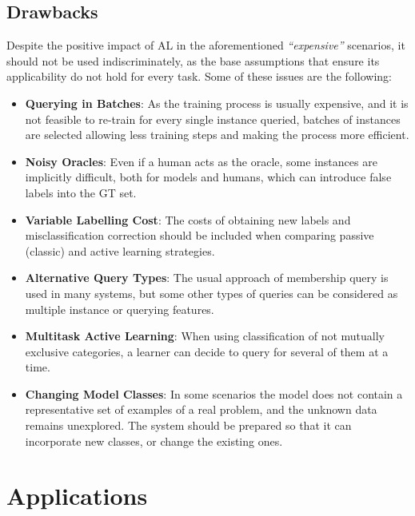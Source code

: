 \documentclass{scrartcl}
\begin{document}
  \subsection{Drawbacks} \label{subsec:drawbacks}
    Despite the positive impact of AL in the aforementioned \emph{``expensive''} scenarios, it should not be used indiscriminately, as the base assumptions that ensure its applicability do not hold for every task. Some of these issues are the following:
    \begin{itemize}
      \item \textbf{Querying in Batches}: As the training process is usually expensive, and it is not feasible to re-train for every single instance queried, batches of instances are selected allowing less training steps and making the process more efficient.
      \item \textbf{Noisy Oracles}: Even if a human acts as the oracle, some instances are implicitly difficult, both for models and humans, which can introduce false labels into the GT set.
      \item \textbf{Variable Labelling Cost}: The costs of obtaining new labels and misclassification correction should be included when comparing passive (classic) and active learning strategies.
      \item \textbf{Alternative Query Types}: The usual approach of membership query is used in many systems, but some other types of queries can be considered as multiple instance or querying features.
      \item \textbf{Multitask Active Learning}:  When using classification of not mutually exclusive categories, a learner can decide to query for several of them at a time.
      \item \textbf{Changing Model Classes}: In some scenarios the model does not contain a representative set of examples of a real problem, and the unknown data remains unexplored. The system should be prepared so that it can incorporate new classes, or change the existing ones.
    \end{itemize}

\section{Applications} \label{sec:applications}
\end{document}
